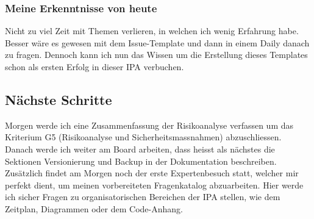 \subsubsection*{Meine Erkenntnisse von heute}
Nicht zu viel Zeit mit Themen verlieren, in welchen ich wenig Erfahrung habe. Besser wäre es gewesen mit dem Issue-Template
und dann in einem Daily danach zu fragen. Dennoch kann ich nun das Wissen um die Erstellung dieses Templates schon als ersten Erfolg in
dieser IPA verbuchen.

\subsection*{Nächste Schritte}
Morgen werde ich eine Zusammenfassung der Risikoanalyse verfassen um das Kriterium G5 (Risikoanalyse und Sicherheitsmassnahmen) abzuschliessen.
Danach werde ich weiter am Board arbeiten, dass heisst als nächstes die Sektionen Versionierung und Backup in der Dokumentation beschreiben.
Zusätzlich findet am Morgen noch der erste Expertenbesuch statt, welcher mir perfekt dient, um meinen vorbereiteten Fragenkatalog abzuarbeiten. 
Hier werde ich sicher Fragen zu organisatorischen Bereichen der IPA stellen, wie dem Zeitplan, Diagrammen oder dem Code-Anhang.

\pagebreak
